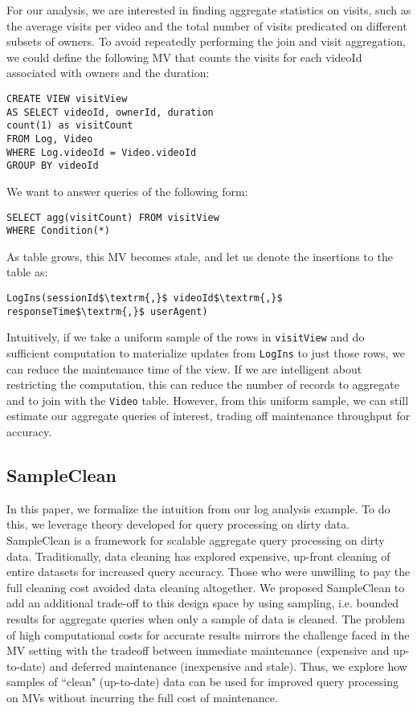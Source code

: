 For our analysis, we are interested in finding aggregate statistics on visits, such as the average visits per video and the total number of visits predicated on different subsets of owners. 
To avoid repeatedly performing the join and visit aggregation, we could define the following MV that counts the visits for each videoId associated with owners and the duration: 
\begin{lstlisting}[mathescape,basicstyle={\scriptsize}]
CREATE VIEW visitView
AS SELECT videoId, ownerId, duration
count(1) as visitCount
FROM Log, Video
WHERE Log.videoId = Video.videoId
GROUP BY videoId
\end{lstlisting}
We want to answer queries of the following form: 
\begin{lstlisting}[mathescape,basicstyle={\scriptsize}]
SELECT agg(visitCount) FROM visitView 
WHERE Condition(*)
\end{lstlisting}
As  table grows, this MV becomes stale, and let us denote the insertions to the table as:
\begin{lstlisting}[mathescape,basicstyle={\scriptsize}]
LogIns(sessionId$\textrm{,}$ videoId$\textrm{,}$ responseTime$\textrm{,}$ userAgent)
\end{lstlisting}
Intuitively, if we take a uniform sample of the rows in \texttt{visitView} and do sufficient computation to materialize updates from \texttt{LogIns} to just those rows, we can reduce the maintenance time of the view.
If we are intelligent about restricting the computation, this can reduce the number of  records to aggregate and to join with the \texttt{Video} table.
However, from this uniform sample, we can still estimate our aggregate queries of interest, trading off maintenance throughput for accuracy.

\subsection{SampleClean~\cite{wang1999sample}}
In this paper, we formalize the intuition from our log analysis example. 
To do this, we leverage theory developed for query processing on dirty data.
SampleClean is a framework for scalable aggregate query processing on dirty data.
Traditionally, data cleaning has explored expensive, up-front cleaning of entire datasets for increased query accuracy.
Those who were unwilling to pay the full cleaning cost avoided data cleaning altogether.
We proposed SampleClean to add an additional trade-off to this design space by using sampling, i.e. bounded results for aggregate queries when only a sample of data is cleaned.
The problem of high computational costs for accurate results mirrors the challenge faced in the MV setting with the tradeoff between immediate maintenance (expensive and up-to-date) and deferred maintenance (inexpensive and stale). 
Thus, we explore how samples of ``clean" (up-to-date) data can be used for improved query processing on MVs without incurring the full cost of maintenance.

